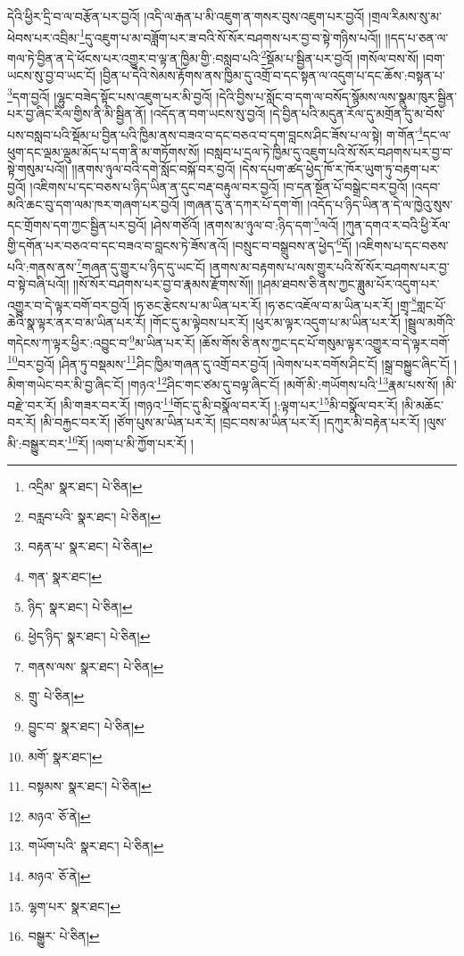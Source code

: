 དེའི་ཕྱིར་དྲི་བ་ལ་བརྩོན་པར་བྱའོ། །འདི་ལ་རྒན་པ་མི་འཇུག་ན་གསར་བུས་འཇུག་པར་བྱའོ། །གྲལ་རིམས་སུ་མ་ཕེབས་པར་འབྲིམ་\footnote{འདྲིམ་  སྣར་ཐང་།  པེ་ཅིན། }དུ་འཇུག་པ་མ་བཟློག་པར་ཟ་བའི་སོ་སོར་བཤགས་པར་བྱ་བ་སྟེ་གཉིས་པའོ།། །།དད་པ་ཅན་ལ་གལ་ཏེ་བྱིན་ན་དེ་ཕོངས་པར་འགྱུར་བ་ལྟ་ན་ཁྱིམ་གྱི་:བསླབ་པའི་\footnote{བརླབ་པའི་  སྣར་ཐང་།  པེ་ཅིན། }སྡོམ་པ་སྦྱིན་པར་བྱའོ། །གསོལ་བས་སོ། །བག་ཡངས་སུ་བྱ་བ་ཡང་ངོ། །བྱིན་པ་དེའི་སེམས་རྟོགས་ནས་ཁྱིམ་དུ་འགྲོ་བ་དང་སྟན་ལ་འདུག་པ་དང་ཆོས་:བསྟན་པ་\footnote{བརྟན་པ་  སྣར་ཐང་།  པེ་ཅིན། }དག་བྱའོ། །ལྷུང་བཟེད་སྟོང་པས་འཇུག་པར་མི་བྱའོ། །དེའི་བྱིས་པ་སློང་བ་དག་ལ་བསོད་སྙོམས་ལས་སྣུམ་ཁུར་སྦྱིན་པར་བྱ་ཞིང་རིལ་གྱིས་ནི་མི་སྦྱིན་ནོ། །འདོད་ན་བག་ཡངས་སུ་བྱའོ། །དེ་བྱིན་པའི་མདུན་རོལ་དུ་མགྲོན་དུ་མ་བོས་པས་བསླབ་པའི་སྡོམ་པ་བྱིན་པའི་ཁྱིམ་ནས་བཟའ་བ་དང་བཅའ་བ་དག་བླངས་ཤིང་ཟོས་པ་ལ་སྟེ། ག་གོན་\footnote{གན་  སྣར་ཐང་། }དང་ལ་ཕུག་དང་ལྡམ་ལྡུམ་མོད་པ་དག་ནི་མ་གཏོགས་སོ། །བསླབ་པ་དྲལ་ཏེ་ཁྱིམ་དུ་འཇུག་པའི་སོ་སོར་བཤགས་པར་བྱ་བ་སྟེ་གསུམ་པའོ།། །།ནགས་ཉུལ་བའི་དགེ་སློང་བསྐོ་བར་བྱའོ། །དེས་དཔག་ཚད་ཕྱེད་ཁོ་ར་ཁོར་ཡུག་ཏུ་བརྟག་པར་བྱའོ། །འཇིགས་པ་དང་བཅས་པ་ཉིད་ཡིན་ན་དུང་བརྡ་བརྟུལ་བར་བྱའོ། །བ་དན་སྔོན་པོ་བསྒྲེང་བར་བྱའོ། །འདབ་མའི་ཆང་བུ་དག་ལམ་ཁར་གཞག་པར་བྱའོ། །གཞན་དུ་ན་དཀར་པོ་དག་གོ། །འདོད་པ་ཉིད་ཡིན་ན་དེ་ལ་ཁྱེའུ་སུས་དང་གྲོགས་དག་ཀྱང་སྦྱིན་པར་བྱའོ། །ཤེས་གཙོའོ། །ནགས་མ་ཉུལ་བ་:ཉིད་དག་\footnote{ཉིད་  སྣར་ཐང་།  པེ་ཅིན། }ལའོ། །ཀུན་དགའ་ར་བའི་ཕྱི་རོལ་གྱི་དགོན་པར་བཅའ་བ་དང་བཟའ་བ་བླངས་ཏེ་ཟོས་ནའོ། །བསྲུང་བ་བསྒྲུབས་ན་ཕྱེད་\footnote{ཕྱེད་ཉིད་  སྣར་ཐང་།  པེ་ཅིན། }དོ། །འཇིགས་པ་དང་བཅས་པའི་:གནས་ནས་\footnote{གནས་ལས་  སྣར་ཐང་།  པེ་ཅིན། }གཞན་དུ་གྱུར་པ་ཉིད་དུ་ཡང་ངོ། །ནགས་མ་བརྟགས་པ་ལས་གྱུར་པའི་སོ་སོར་བཤགས་པར་བྱ་བ་སྟེ་བཞི་པའོ།། །།སོ་སོར་བཤགས་པར་བྱ་བ་རྣམས་རྫོགས་སོ།། །།ཤམ་ཐབས་ཅི་ནས་ཀྱང་ཟླུམ་པོར་འདུག་པར་འགྱུར་བ་དེ་ལྟར་བགོ་བར་བྱའོ། །ཧ་ཅང་རྩེངས་པ་མ་ཡིན་པར་རོ། །ཧ་ཅང་འཇོལ་བ་མ་ཡིན་པར་རོ། །གྲྭ་\footnote{གྲུ་  པེ་ཅིན། }གླང་པོ་ཆེའི་སྣ་ལྟར་ནར་བ་མ་ཡིན་པར་རོ། །གོང་དུ་མ་ལྟེབས་པར་རོ། །ཕུར་མ་ལྟར་འདུག་པ་མ་ཡིན་པར་རོ། །སྦྲུལ་མགོའི་གདེངས་ཀ་ལྟར་ཕྱིར་:འབྱུང་བ་\footnote{བྱུང་བ་  སྣར་ཐང་།  པེ་ཅིན། }མ་ཡིན་པར་རོ། །ཆོས་གོས་ཅི་ནས་ཀྱང་དང་པོ་གསུམ་ལྟར་འགྱུར་བ་དེ་ལྟར་བགོ་\footnote{མགོ་  སྣར་ཐང་། }བར་བྱའོ། །ཤིན་ཏུ་བསྡམས་\footnote{བསྟམས་  སྣར་ཐང་།  པེ་ཅིན། }ཤིང་ཁྱིམ་གཞན་དུ་འགྲོ་བར་བྱའོ། །ལེགས་པར་བགོས་ཤིང་ངོ། །སྒྲ་བསྐྱུང་ཞིང་ངོ། །མིག་གཡེང་བར་མི་བྱ་ཞིང་ངོ། །གཉའ་\footnote{མཉའ་  ཅོ་ནེ། }ཤིང་གང་ཙམ་དུ་བལྟ་ཞིང་ངོ། །མགོ་མི་:གཡོགས་པའི་\footnote{གཡོག་པའི་  སྣར་ཐང་།  པེ་ཅིན། }རྣམ་པས་སོ། །མི་བརྫེ་བར་རོ། །མི་གཟར་བར་རོ། །གཉའ་\footnote{མཉའ་  ཅོ་ནེ། }གོང་དུ་མི་བསྣོལ་བར་རོ། །:ལྟག་པར་\footnote{ལྷག་པར་  སྣར་ཐང་། }མི་བསྣོལ་བར་རོ། །མི་མཆོང་བར་རོ། །མི་བརྐྱང་བར་རོ། །ཙོག་པུས་མ་ཡིན་པར་རོ། །བྲང་བས་མ་ཡིན་པར་རོ། །དཀུར་མི་བརྟེན་པར་རོ། །ལུས་མི་:བསྒྱུར་བར་\footnote{བསྒྱུར་  པེ་ཅིན། }རོ། །ལག་པ་མི་ཀྱོག་པར་རོ། །
